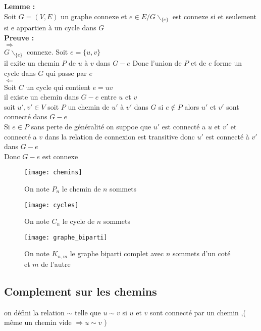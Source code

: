 \documentclass{report}
\newcommand{\preuve}{\textcolor[rgb]{0.95,0.25,0}{Preuve : }}
\newcommand{\Preuve}{\textbf{\preuve}}
\newcommand{\lemme}{\textcolor[rgb]{0,0.2,0.80}{Lemme : }}
\newcommand{\Lemme}{\textbf{\lemme}}
\begin{document}
\Lemme\\
Soit $G=(V,E)$  un graphe connexe et $e \in E/ G\backslash_{\{e\}}$ est connexe si et seulement si e appartien à un cycle dans $G$\\

\Preuve\\
$\Rightarrow$\\
$G\backslash_{\{e\}}$ connexe. Soit $e=\{u,v\}$\\
il exite un chemin $P$ de $u$ à $v$ dans $G-e$ Donc l'union de $P$ et de $e$ forme un cycle dans $G$ qui passe par $e$\\
$\Leftarrow$\\
Soit $C$ un cycle qui contient $e=uv$\\
il existe un chemin dans $G-e$ entre $u$ et $v$\\
soit $u',v' \in V$ soit $P$ un chemin de $u'$ à $v'$ dans $G$ si $e\notin P$ alors $u'$ et $v'$ sont connecté dans $G-e$\\

Si $e \in P$ sans perte de généralité on suppoe que $u'$ est connecté a $u$ et $v'$ et connecté a $v$ dans la relation de connexion est transitive donc $u'$ est connecté à $v'$ dans $G-e$\\
Donc $G-e$ est connexe\\

\begin{figure}[h]
	\centering
		\texttt{[image: chemins]}
	\caption{On note $P_n$ le chemin de $n$ sommets}
	\label{chemins}
\end{figure}

\begin{figure}[h]
	\centering
		\texttt{[image: cycles]}
	\caption{On note $C_n$ le cycle de $n$ sommets}
	\label{cycles}
\end{figure}

\begin{figure}[h]
	\centering
		\texttt{[image: graphe\_biparti]}
	\caption{On note $K_{n,m}$ le graphe biparti complet avec $n$ sommets d'un coté et $m$ de l'autre}
	\label{graphe_biparti}
\end{figure}

\subsection{Complement sur les chemins}

on défini la relation $\sim$ telle que $u \sim v$ si $u$ et $v$ sont connecté par un chemin ,( même un chemin vide $\Rightarrow u \sim v$ )\\
\end{document}
